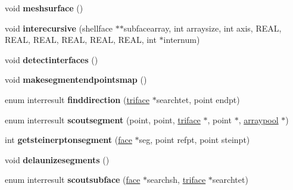 \begin{DoxyCompactItemize}
\item 
\hypertarget{classtetgenmesh_a0c51cd3511d2b0ef9d0d45fe8b546b2e}{void {\bfseries meshsurface} ()}\label{classtetgenmesh_a0c51cd3511d2b0ef9d0d45fe8b546b2e}

\item 
\hypertarget{classtetgenmesh_a46c5e7f1f3f94dd0c493f2b559671854}{void {\bfseries interecursive} (shellface $\ast$$\ast$subfacearray, int arraysize, int axis, R\-E\-A\-L, R\-E\-A\-L, R\-E\-A\-L, R\-E\-A\-L, R\-E\-A\-L, R\-E\-A\-L, int $\ast$internum)}\label{classtetgenmesh_a46c5e7f1f3f94dd0c493f2b559671854}

\item 
\hypertarget{classtetgenmesh_a854e8e8d77d2d1b2b74372a87a1a7717}{void {\bfseries detectinterfaces} ()}\label{classtetgenmesh_a854e8e8d77d2d1b2b74372a87a1a7717}

\item 
\hypertarget{classtetgenmesh_ac56b6a4bdcc053b5cc6afc005c8e1a69}{void {\bfseries makesegmentendpointsmap} ()}\label{classtetgenmesh_ac56b6a4bdcc053b5cc6afc005c8e1a69}

\item 
\hypertarget{classtetgenmesh_a4a33553a18b0e9535d43d683b9473cbf}{enum interresult {\bfseries finddirection} (\hyperlink{classtetgenmesh_1_1triface}{triface} $\ast$searchtet, point endpt)}\label{classtetgenmesh_a4a33553a18b0e9535d43d683b9473cbf}

\item 
\hypertarget{classtetgenmesh_a92560ebc99b4555a560030efa62d2382}{enum interresult {\bfseries scoutsegment} (point, point, \hyperlink{classtetgenmesh_1_1triface}{triface} $\ast$, point $\ast$, \hyperlink{classtetgenmesh_1_1arraypool}{arraypool} $\ast$)}\label{classtetgenmesh_a92560ebc99b4555a560030efa62d2382}

\item 
\hypertarget{classtetgenmesh_ac06ee6fd9ced44e8e9c5bb520c5c2c7f}{int {\bfseries getsteinerptonsegment} (\hyperlink{classtetgenmesh_1_1face}{face} $\ast$seg, point refpt, point steinpt)}\label{classtetgenmesh_ac06ee6fd9ced44e8e9c5bb520c5c2c7f}

\item 
\hypertarget{classtetgenmesh_a8dee14a42e35e4fe65944518eed4f7d3}{void {\bfseries delaunizesegments} ()}\label{classtetgenmesh_a8dee14a42e35e4fe65944518eed4f7d3}

\item 
\hypertarget{classtetgenmesh_a7e3a8dd4329224b77b9ca50e97e54956}{enum interresult {\bfseries scoutsubface} (\hyperlink{classtetgenmesh_1_1face}{face} $\ast$searchsh, \hyperlink{classtetgenmesh_1_1triface}{triface} $\ast$searchtet)}\label{classtetgenmesh_a7e3a8dd4329224b77b9ca50e97e54956}


\end{DoxyCompactItemize}

